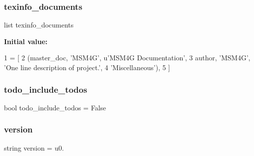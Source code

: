 \subsubsection{\texorpdfstring{texinfo\+\_\+documents}{texinfo\_documents}}
{\footnotesize\ttfamily list texinfo\+\_\+documents}

{\bfseries Initial value\+:}
\begin{DoxyCode}
1 =  [
2     (master\_doc, \textcolor{stringliteral}{'MSM4G'}, \textcolor{stringliteral}{u'MSM4G Documentation'},
3      author, \textcolor{stringliteral}{'MSM4G'}, \textcolor{stringliteral}{'One line description of project.'},
4      \textcolor{stringliteral}{'Miscellaneous'}),
5 ]
\end{DoxyCode}
\hypertarget{namespaceconf_a9c7a99d15e14d10286285d3e49eeb704}{}\label{namespaceconf_a9c7a99d15e14d10286285d3e49eeb704} 
\subsubsection{\texorpdfstring{todo\+\_\+include\+\_\+todos}{todo\_include\_todos}}
{\footnotesize\ttfamily bool todo\+\_\+include\+\_\+todos = False}

\hypertarget{namespaceconf_af9c8593b58583463efe6932e24c9d6e6}{}\label{namespaceconf_af9c8593b58583463efe6932e24c9d6e6} 
\subsubsection{\texorpdfstring{version}{version}}
{\footnotesize\ttfamily string version = u\textquotesingle{}0.\textquotesingle{}}

